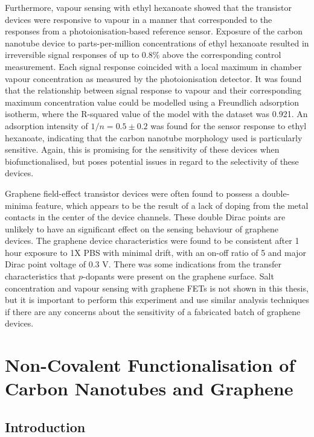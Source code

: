 \documentclass[
  a4paper,
]{scrbook}
\begin{document}
Furthermore, vapour sensing with ethyl hexanoate showed that the
transistor devices were responsive to vapour in a manner that
corresponded to the responses from a photoionisation-based reference
sensor. Exposure of the carbon nanotube device to parts-per-million
concentrations of ethyl hexanoate resulted in irreversible signal
responses of up to 0.8\% above the corresponding control measurement.
Each signal response coincided with a local maximum in chamber vapour
concentration as measured by the photoionisation detector. It was found
that the relationship between signal response to vapour and their
corresponding maximum concentration value could be modelled using a
Freundlich adsorption isotherm, where the R-squared value of the model
with the dataset was 0.921. An adsorption intensity of
\(1/n = 0.5\pm0.2\) was found for the sensor response to ethyl
hexanoate, indicating that the carbon nanotube morphology used is
particularly sensitive. Again, this is promising for the sensitivity of
these devices when biofunctionalised, but poses potential issues in
regard to the selectivity of these devices.

Graphene field-effect transistor devices were often found to possess a
double-minima feature, which appears to be the result of a lack of
doping from the metal contacts in the center of the device channels.
These double Dirac points are unlikely to have an significant effect on
the sensing behaviour of graphene devices. The graphene device
characteristics were found to be consistent after 1 hour exposure to 1X
PBS with minimal drift, with an on-off ratio of 5 and major Dirac point
voltage of 0.3 V. There was some indications from the transfer
characteristics that \(p\)-dopants were present on the graphene surface.
Salt concentration and vapour sensing with graphene FETs is not shown in
this thesis, but it is important to perform this experiment and use
similar analysis techniques if there are any concerns about the
sensitivity of a fabricated batch of graphene devices.


\hypertarget{sec-noncovalent-functionalisation}{%
\chapter{Non-Covalent Functionalisation of Carbon Nanotubes and
Graphene}\label{sec-noncovalent-functionalisation}}

\hypertarget{introduction-1}{%
\section{Introduction}\label{introduction-1}}
\end{document}
